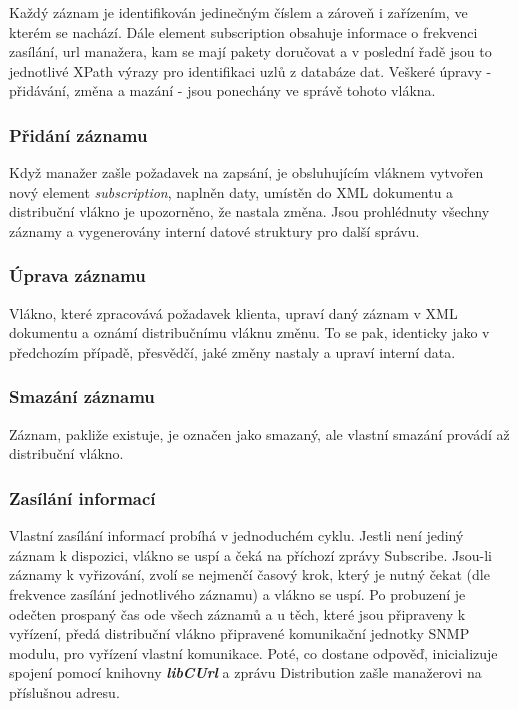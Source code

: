 Každý záznam je identifikován jedinečným číslem a zároveň i zařízením, ve kterém se nachází. Dále element subscription obsahuje informace o frekvenci zasílání, 
url manažera, kam se mají pakety doručovat a v poslední řadě jsou to jednotlivé XPath výrazy pro identifikaci uzlů z databáze dat.
Veškeré úpravy - přidávání, změna a mazání - jsou ponechány ve správě tohoto vlákna.

\subsubsection*{Přidání záznamu}
Když manažer zašle požadavek na zapsání, je obsluhujícím vláknem vytvořen nový element \textit{subscription}, naplněn daty, umístěn do XML dokumentu a 
distribuční vlákno je upozorněno, že nastala změna. Jsou prohlédnuty všechny záznamy a vygenerovány interní datové struktury pro další správu.

\subsubsection*{Úprava záznamu}
Vlákno, které zpracovává požadavek klienta, upraví daný záznam v XML dokumentu a oznámí distribučnímu vláknu změnu. To se pak, identicky jako v předchozím případě,
přesvědčí, jaké změny nastaly a upraví interní data.

\subsubsection*{Smazání záznamu}
Záznam, pakliže existuje, je označen jako smazaný, ale vlastní smazání provádí až distribuční vlákno.

\subsubsection*{Zasílání informací}
Vlastní zasílání informací probíhá v jednoduchém cyklu. Jestli není jediný záznam k dispozici, vlákno se uspí a čeká na příchozí zprávy Subscribe. Jsou-li záznamy
k vyřizování, zvolí se nejmenčí časový krok, který je nutný čekat (dle frekvence zasílání jednotlivého záznamu) a vlákno se uspí. Po probuzení je odečten
prospaný čas ode všech záznamů a u těch, které jsou připraveny k vyřízení, předá distribuční vlákno připravené komunikační jednotky SNMP modulu, pro vyřízení
vlastní komunikace. Poté, co dostane odpověď, inicializuje spojení pomocí knihovny \textbf{\textit{libCUrl}} a zprávu Distribution zašle manažerovi na příslušnou
adresu.

